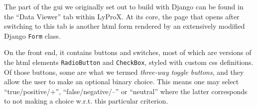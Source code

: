\documentclass[\relativeRoot/main.tex]{subfiles}
\begin{document}
The part of the \gls{gui} we originally set out to build with Django can be found in the ``Data Viewer'' tab within LyProX. At its core, the page that opens after switching to this tab is another \acrshort{html} form rendered by an extensively modified Django \texttt{Form} class.

On the front end, it contains buttons and switches, most of which are versions of the \acrshort{html} elements \texttt{RadioButton} and \texttt{CheckBox}, styled with custom \acrshort{css} definitions. Of those buttons, some are what we termed \emph{three-way toggle buttons}, and they allow the user to make an optional binary choice. This means one may select ``true/positive/+'', ``false/negative/--'' or ``neutral'' where the latter corresponds to not making a choice w.r.t. this particular criterion.
\end{document}

